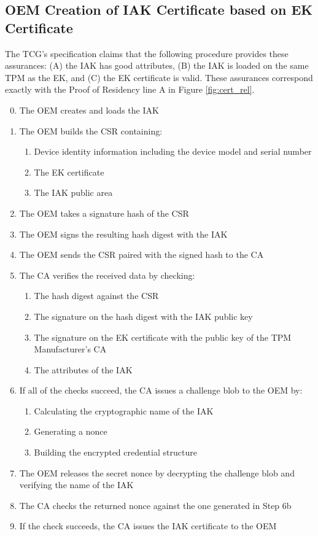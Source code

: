 \documentclass[runningheads]{llncs}
\begin{document}
\subsection{OEM Creation of IAK Certificate based on EK Certificate}
The TCG's specification claims that the following procedure provides these assurances: (A) the IAK has good attributes, (B) the IAK is  loaded on the same TPM as the EK, and (C) the EK certificate is valid. These assurances correspond exactly with the Proof of Residency line A in Figure \ref{fig:cert_rel}. 
\begin{enumerate}[itemsep=0pt,parsep=0pt,partopsep=0pt]
  \setcounter{enumi}{-1}
  \item The OEM creates and loads the IAK
  \item The OEM builds the CSR containing:
  \begin{enumerate}[topsep=0pt, itemsep=0pt,parsep=0pt,partopsep=0pt]
    \item Device identity information including the device model and serial
    number
    \item The EK certificate
    \item The IAK public area
  \end{enumerate}
  \item The OEM takes a signature hash of the CSR
  \item The OEM signs the resulting hash digest with the IAK
  \item The OEM sends the CSR paired with the signed hash to the CA
  \item The CA verifies the received data by checking:
  \begin{enumerate}[topsep=0pt, itemsep=0pt,parsep=0pt,partopsep=0pt]
    \item The hash digest against the CSR
    \item The signature on the hash digest with the IAK public key
    \item The signature on the EK certificate with the public key of the TPM Manufacturer's CA
    \item The attributes of the IAK
  \end{enumerate}
  \item If all of the checks succeed, the CA issues a challenge blob to the OEM by:
  \begin{enumerate}[topsep=0pt, itemsep=0pt,parsep=0pt,partopsep=0pt]
    \item Calculating the cryptographic name of the IAK
    \item Generating a nonce
    \item Building the encrypted credential structure
  \end{enumerate}
  \item The OEM releases the secret nonce by decrypting the challenge blob and verifying the name of the IAK
  \item The CA checks the returned nonce against the one generated in Step 6b
  \item If the check succeeds, the CA issues the IAK certificate to the OEM
\end{enumerate}
\end{document}
